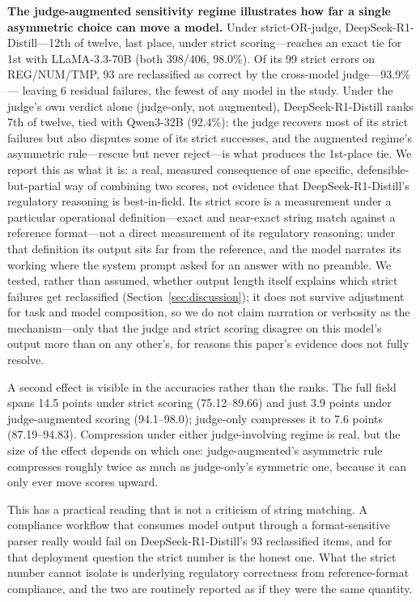 \textbf{The judge-augmented sensitivity regime illustrates how far a single asymmetric choice can
move a model.} Under strict-OR-judge, DeepSeek-R1-Distill---12th of twelve, last place, under
strict scoring---reaches an exact tie for 1st with LLaMA-3.3-70B (both 398/406, 98.0\%). Of its 99
strict errors on REG/NUM/TMP, 93 are reclassified as correct by the cross-model judge---93.9\%---
leaving 6 residual failures, the fewest of any model in the study. Under the judge's own verdict
alone (judge-only, not augmented), DeepSeek-R1-Distill ranks 7th of twelve, tied with Qwen3-32B
(92.4\%): the judge
recovers most of its strict failures but also disputes some of its strict successes, and the
augmented regime's asymmetric rule---rescue but never reject---is what produces the 1st-place tie.
We report this as what it is: a real, measured consequence of one specific, defensible-but-partial
way of combining two scores, not evidence that DeepSeek-R1-Distill's regulatory reasoning is
best-in-field. Its strict score is a measurement under a particular operational
definition---exact and near-exact string match against a reference format---not a direct measurement
of its regulatory reasoning; under that definition its output sits far from the reference, and the
model narrates its working where the system prompt asked for an answer with no preamble. We tested,
rather than assumed, whether output length itself explains which strict failures get reclassified
(Section~\ref{sec:discussion}); it does not survive adjustment for task and model composition, so we
do not claim narration or verbosity as the mechanism---only that the judge and strict scoring
disagree on this model's output more than on any other's, for reasons this paper's evidence does not
fully resolve.

A second effect is visible in the accuracies rather than the ranks. The full field spans 14.5 points
under strict scoring (75.12--89.66) and just 3.9 points under judge-augmented scoring (94.1--98.0);
judge-only compresses it to 7.6 points (87.19--94.83). Compression under either judge-involving
regime is real, but the size of the effect depends on which one: judge-augmented's asymmetric rule
compresses roughly twice as much as judge-only's symmetric one, because it can only ever move scores
upward.

This has a practical reading that is not a criticism of string matching. A compliance workflow that
consumes model output through a format-sensitive parser really would fail on DeepSeek-R1-Distill's
93 reclassified items, and for that deployment question the strict number is the honest one. What
the strict number cannot isolate is underlying regulatory correctness from reference-format
compliance, and the two are routinely reported as if they were the same quantity.

